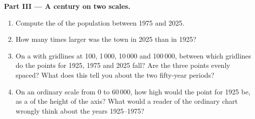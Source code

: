 \begin{problem}
\medskip
\noindent\textbf{Part III --- A century on two scales.}
\begin{enumerate}[resume]
  \item Compute the  of the population between 1975 and 2025.
  \item How many times larger was the town in 2025 than in 1925?
  \item On a  with gridlines at 100, 1\,000, 10\,000 and
        100\,000, between which gridlines do the points for 1925, 1975 and
        2025 fall? Are the three points evenly spaced? What does this tell you
        about the two fifty-year periods?
  \item On an ordinary scale from 0 to 60\,000, how high would the point for
        1925 be, as a  of the height of the axis? What would a reader of
        the ordinary chart wrongly think about the years 1925--1975?
\end{enumerate}
\end{problem}
